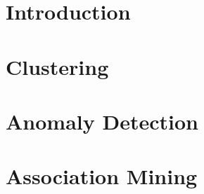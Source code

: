 \documentclass[11pt,fleqn]{article}
\numberwithin{footnote}{section}
\numberwithin{figure}{section}
\numberwithin{table}{section}
\begin{document}
\clearpage
\setcounter{page}{1}
\section{Introduction}


\section{Clustering}


\section{Anomaly Detection}


\section{Association Mining}

\end{document}
